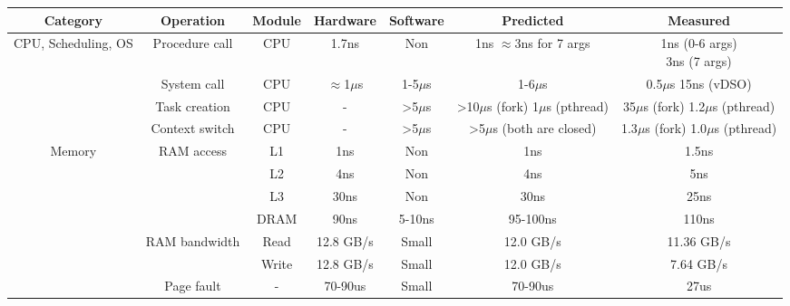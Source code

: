
\begin{table*}[t]
	\centering
	\begin{tabular}{c|c|c|c|c|c|c}
		\hline
		\textbf{Category} & \textbf{Operation} & \textbf{Module} & \textbf{Hardware} & \textbf{Software}  & \textbf{Predicted} & \textbf{Measured} \\ \hline \hline

		\multirow{4}{*}{CPU, Scheduling, OS} & Procedure call & CPU & 1.7ns & Non  & \makecell{1ns \\ $\approx$3ns \\ for 7 args} & \makecell{1ns (0-6 args) \\ 3ns (7 args)} \\ \cline{2-7}

          & System call & CPU & $\approx$1$\mu$s & 1-5$\mu$s & 1-6$\mu$s & \makecell{0.5$\mu$s \\ 15ns (vDSO)} \\ \cline{2-7}
          
          & Task creation & CPU & - & >5$\mu$s & \makecell{>10$\mu$s (fork) \\ 1$\mu$s (pthread)} & \makecell{35$\mu$s (fork) \\ 1.2$\mu$s (pthread)} \\ \cline{2-7}
        
          & Context switch & CPU & - & >5$\mu$s & \makecell{>5$\mu$s \\  (both are closed)} & \makecell{1.3$\mu$s (fork) \\ 1.0$\mu$s (pthread)} \\ \hline

        \multirow{6}{*}{Memory} & \multirow{4}{*}{RAM access} & L1 & 1ns & Non & 1ns & 1.5ns \\ \cline{3-7}
                                &  & L2 & 4ns & Non & 4ns & 5ns \\ \cline{3-7}
                                &  & L3 & 30ns & Non & 30ns & 25ns \\ \cline{3-7}
                                &  & DRAM & 90ns & 5-10ns & 95-100ns & 110ns \\ \cline{2-7}

          & \multirow{2}{*}{RAM bandwidth} & Read & 12.8 GB/s & Small & 12.0 GB/s &  11.36 GB/s \\ \cline{3-7}

          & & Write & 12.8 GB/s & Small & 12.0 GB/s & 7.64 GB/s \\ \cline{2-7}

          & Page fault & - & 70-90us & Small & 70-90us & 27us \\ \hline


\end{tabular}
\end{table*}
